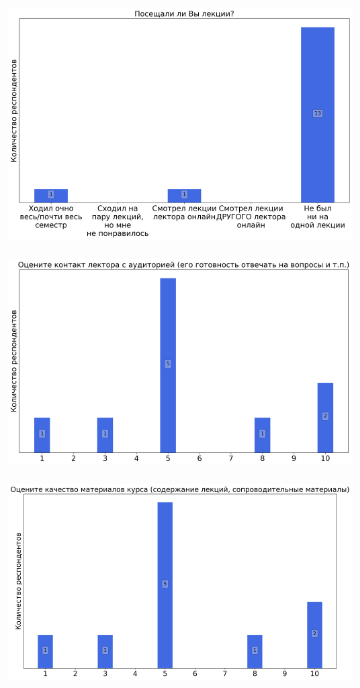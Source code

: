 		\begin{figure}[H]
			\centering
            \begin{subfigure}[b]{0.45\textwidth}
				\centering
				\includegraphics[width=\textwidth]{images/4 course/Введение в распараллеливание алгоритмов и программ/lecturer-questions-Карпов В.Е.-0.png}
			\end{subfigure}
			\begin{subfigure}[b]{0.45\textwidth}
				\centering
				\includegraphics[width=\textwidth]{images/4 course/Введение в распараллеливание алгоритмов и программ/lecturer-marks-Карпов В.Е.-0.png}
			\end{subfigure}
			\begin{subfigure}[b]{0.45\textwidth}
				\centering
				\includegraphics[width=\textwidth]{images/4 course/Введение в распараллеливание алгоритмов и программ/lecturer-marks-Карпов В.Е.-1.png}

\end{subfigure}
\end{figure}
